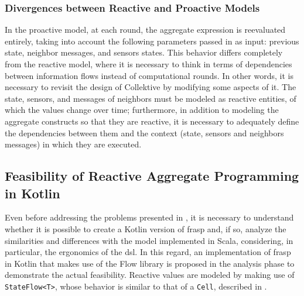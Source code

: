 \subsubsection{Divergences between Reactive and Proactive Models}

In the proactive model, at each round, the aggregate expression is reevaluated entirely, taking into account the following parameters passed in as input: previous state, neighbor messages, and sensors states. This behavior differs completely from the reactive model, where it is necessary to think in terms of dependencies between information flows instead of computational rounds. In other words, it is necessary to revisit the design of Collektive by modifying some aspects of it. The state, sensors, and messages of neighbors must be modeled as reactive entities, of which the values change over time; furthermore, in addition to modeling the aggregate constructs so that they are reactive, it is necessary to adequately define the dependencies between them and the context (state, sensors and neighbors messages) in which they are executed.

\subsection{Feasibility of Reactive Aggregate Programming in Kotlin}
\label{subsection:Feasibility-Reactive-Aggregate-Programming}

Even before addressing the problems presented in , it is necessary to understand whether it is possible to create a Kotlin version of \ac{frasp} and, if so, analyze the similarities and differences with the model implemented in Scala, considering, in particular, the ergonomics of the \ac{dsl}. In this regard, an implementation of \ac{frasp} in Kotlin that makes use of the Flow library is proposed in the analysis phase to demonstrate the actual feasibility. Reactive values are modeled by making use of \texttt{StateFlow<T>}, whose behavior is similar to that of a \texttt{Cell}, described in .

